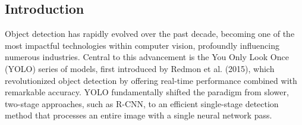\begin{multicols}{2}
\section{Introduction}
    Object detection has rapidly evolved over the past decade, becoming one of the most impactful technologies within computer vision, profoundly influencing numerous industries. 
    Central to this advancement is the You Only Look Once (YOLO) series of models, first introduced by Redmon et al. (2015), which revolutionized object detection by offering real-time performance combined with remarkable accuracy.
    YOLO fundamentally shifted the paradigm from slower, two-stage approaches, such as R-CNN, to an efficient single-stage detection method that processes an entire image with a single neural network pass.
\end{multicols}

